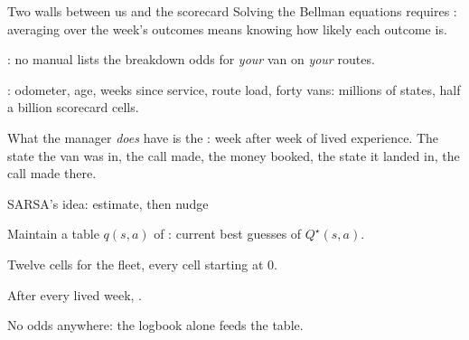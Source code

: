 
\begin{frame}{Two walls between us and the scorecard}
Solving the Bellman equations requires : averaging over the week's outcomes means knowing how likely each outcome is.
\pause
\begin{alertbox}
\begin{bullets}
\item {}: no manual lists the breakdown odds for \emph{your} van on \emph{your} routes.
\item {}: odometer, age, weeks since service, route load, forty vans: millions of states, half a billion scorecard cells.
\end{bullets}
\end{alertbox}
\pause
What the manager \emph{does} have is the : week after week of lived experience. The state the van was in, the call made, the money booked, the state it landed in, the call made there.
\end{frame}

\begin{frame}{SARSA's idea: estimate, then nudge}
\begin{bullets}
\item Maintain a table $q(s,a)$ of : current best guesses of $Q^\star(s,a)$.
\item Twelve cells for the fleet, every cell starting at $0$.
\pause
\item After every lived week, .
\item No odds anywhere: the logbook alone feeds the table.
\end{bullets}
\end{frame}

